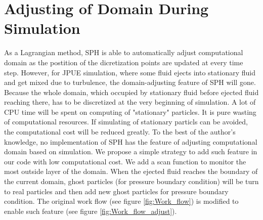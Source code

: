 \documentclass[conference,compsoc]{IEEEtran}
\begin{document}
\section{Adjusting of Domain During Simulation}
As a Lagrangian method, SPH is able to automatically adjust computational domain as the postition of the dicretization points are updated at every time step. However, for JPUE simulation, where some fluid ejects into stationary fluid and get mixed due to turbulence, the domain-adjusting feature of SPH will gone. Because the whole domain, which occupied by stationary fluid before ejected fluid reaching there, has to be discretized at the very beginning of simulation. A lot of CPU time will be spent on computing of "stationary" particles. It is pure wasting of computational resources. If simulating of stationary particls can be avoided, the computational cost will be reduced greatly. To the best of the author's knowledge, no implementation of SPH has the feature of adjusting computational domain based on simulation. We propose a simple strategy to add such feature in our code with low computational cost. We add a scan function to monitor the most outside layer of the domain. When the ejected fluid reaches the boundary of the current domain, ghost particles (for pressure boundary condition) will be turn to real particles and then add new ghost particles for pressure boundary condition. The original work flow (see figure \ref{fig:Work_flow}) is modified to enable such feature (see figure \ref{fig:Work_flow_adjust}).\\
\end{document}

